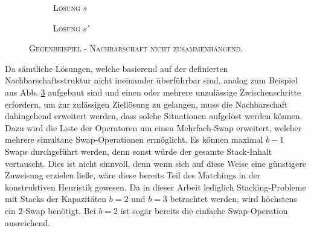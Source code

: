 \begin{figure}[H]
  \begin{subfigure}[b]{0.5\textwidth}
  \centering
    \caption{\textsc{Lösung $s$}}
    \label{fig:counter_a}
  \end{subfigure}
  \hfill
  \begin{subfigure}[b]{0.5\textwidth}
  \centering
    \caption{\textsc{Lösung $s'$}}
    \label{fig:counter_b}
  \end{subfigure}
  \caption{\textsc{Gegenbeispiel - Nachbarschaft nicht zusammenhängend.}}
  \label{fig:counter_example_stacks}
\end{figure}

Da sämtliche Lösungen, welche basierend auf der definierten Nachbarschaftsstruktur nicht ineinander überführbar sind,
analog zum Beispiel aus Abb. \ref{fig:counter_example_stacks} aufgebaut sind und einen oder mehrere unzulässige
Zwischenschritte erfordern, um zur zulässigen Ziellösung zu gelangen, muss die Nachbarschaft dahingehend erweitert werden,
dass solche Situationen aufgelöst werden können.
Dazu wird die Liste der Operatoren um einen Mehrfach-Swap erweitert, welcher mehrere simultane Swap-Operationen
ermöglicht. Es können maximal $b - 1$ Swaps durchgeführt werden, denn sonst würde der gesamte Stack-Inhalt
vertauscht. Dies ist nicht sinnvoll, denn wenn sich auf diese Weise eine günstigere Zuweisung erzielen ließe,
wäre diese bereits Teil des Matchings in der konstruktiven Heuristik gewesen. Da in dieser Arbeit lediglich
Stacking-Probleme mit Stacks der Kapazitäten $b = 2$ und $b = 3$ betrachtet werden, wird höchstens ein $2$-Swap
benötigt. Bei $b = 2$ ist sogar bereits die einfache Swap-Operation ausreichend.

